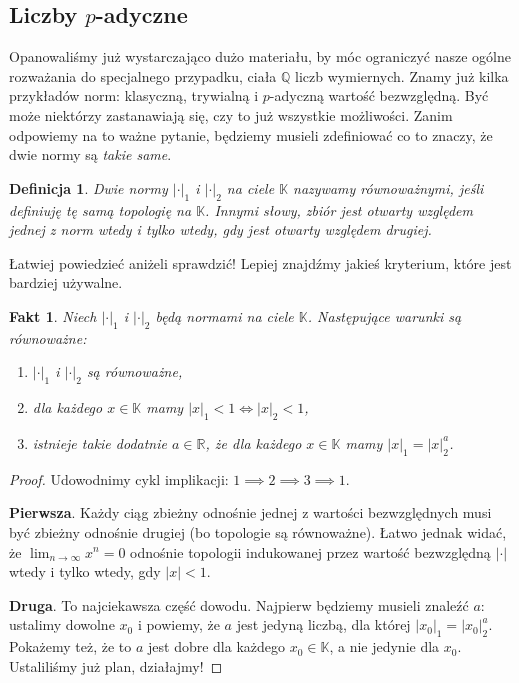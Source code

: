 \documentclass[a4paper,fleqn]{article}
\newtheorem{fkt}{Fakt}
\newtheorem{dff}{Definicja}
\newenvironment{enumx}{\begin{enumerate}
	\setlength{\itemsep}{0pt}
	\setlength{\parskip}{0pt}
	\setlength{\parsep}{0pt}}
{\end{enumerate}}
\begin{document}
\begin{multicols}{2}
\section{Liczby $p$-adyczne}
Opanowaliśmy już wystarczająco dużo materiału, by móc ograniczyć nasze ogólne rozważania do specjalnego przypadku, ciała $\mathbb Q$ liczb wymiernych. Znamy już kilka przykładów norm: klasyczną, trywialną i $p$-adyczną wartość bezwzględną. Być może niektórzy zastanawiają się, czy to już wszystkie możliwości. Zanim odpowiemy na to ważne pytanie, będziemy musieli zdefiniować co to znaczy, że dwie normy są \emph{takie same}.

\begin{dff}Dwie normy $|\cdot|_1$ i $|\cdot|_2$ na ciele $\mathbb K$ nazywamy równoważnymi, jeśli definiuję tę samą topologię na $\mathbb K$. Innymi słowy, zbiór jest otwarty względem jednej z norm wtedy i tylko wtedy, gdy jest otwarty względem drugiej.\end{dff}

Łatwiej powiedzieć aniżeli sprawdzić! Lepiej znajdźmy jakieś kryterium, które jest bardziej używalne.

\begin{fkt}Niech $|\cdot|_1$ i $|\cdot|_2$ będą normami na ciele $\mathbb K$. Następujące warunki są równoważne:
\begin{enumx}
\item $|\cdot|_1$ i $|\cdot|_2$ są równoważne,
\item dla każdego $x\in\mathbb K$ mamy $|x|_1 < 1 \iff |x|_2 < 1$,
\item istnieje takie dodatnie $a \in \mathbb R$, że dla każdego $x\in\mathbb K$ mamy $|x|_1 = |x|_2^a$.
\end{enumx}\end{fkt}
\begin{proof}Udowodnimy cykl implikacji: $1\implies2\implies3\implies1$.

\textbf{Pierwsza}. Każdy ciąg zbieżny odnośnie jednej z wartości bezwzględnych musi być zbieżny odnośnie drugiej (bo topologie są równoważne). Łatwo jednak widać, że $\lim_{n\rightarrow \infty} x^n = 0$ odnośnie topologii indukowanej przez wartość bezwzględną $|\cdot|$ wtedy i tylko wtedy, gdy $|x|<1$.

\textbf{Druga}. To najciekawsza część dowodu. Najpierw będziemy musieli znaleźć $a$: ustalimy dowolne $x_0$ i powiemy, że $a$ jest jedyną liczbą, dla której $|x_0|_1 = |x_0|_2^a$. Pokażemy też, że to $a$ jest dobre dla każdego $x_0 \in \mathbb K$, a nie jedynie dla $x_0$. Ustaliliśmy już plan, działajmy!


\end{proof}
\end{multicols}
\end{document}
